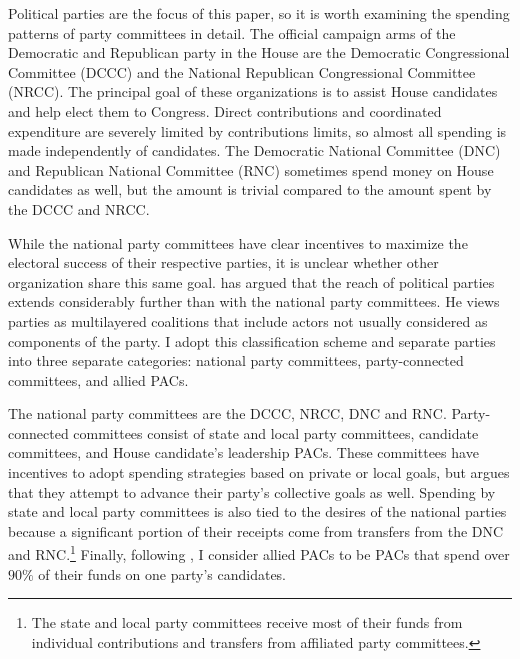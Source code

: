 \documentclass[12pt,final,fleqn]{article}
\theoremstyle{plain}
\begin{document}
Political parties are the focus of this paper, so it is worth examining the spending patterns of party committees in detail. The official campaign arms of the Democratic and Republican party in the House are the Democratic Congressional Committee (DCCC) and the National Republican Congressional Committee (NRCC). The principal goal of these organizations is to assist House candidates and help elect them to Congress. Direct contributions and coordinated expenditure are severely limited by contributions limits, so almost all spending is made independently of candidates. The Democratic National Committee (DNC) and Republican National Committee (RNC) sometimes spend money on House candidates as well, but the amount is trivial compared to the amount spent by the DCCC and NRCC.

While the national party committees have clear incentives to maximize the electoral success of their respective parties, it is unclear whether other organization share this same goal. \citet{herrnson2009roles} has argued that the reach of political parties extends considerably further than with the national party committees. He views parties as multilayered coalitions that include actors not usually considered as components of the party. I adopt this classification scheme and separate parties into three separate categories: national party committees, party-connected committees, and allied PACs. 

The national party committees are the DCCC, NRCC, DNC and RNC. Party-connected committees consist of state and local party committees, candidate committees, and House candidate's leadership PACs. These committees have incentives to adopt spending strategies based on private or local goals, but \citet{herrnson2009roles} argues that they attempt to advance their party's collective goals as well. Spending by state and local party committees is also tied to the desires of the national parties because a significant portion of their receipts come from transfers from the DNC and RNC.\footnote{The state and local party committees receive most of their funds from individual contributions and transfers from affiliated party committees.} Finally, following \citet{herrnson2009roles}, I consider allied PACs to be PACs that spend over $90\%$ of their funds on one party's candidates.
\end{document}
